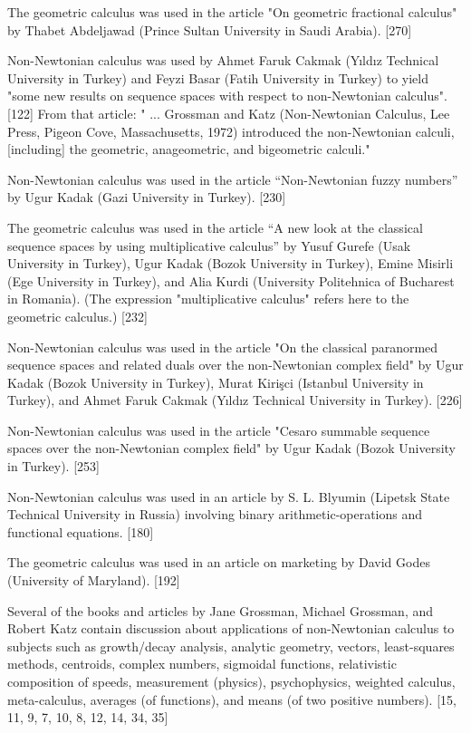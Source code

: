 \documentclass[12pt]{article}
\begin{document}
The geometric calculus was used in the article "On geometric fractional calculus" by Thabet Abdeljawad (Prince Sultan University in Saudi Arabia). [270]
 

Non-Newtonian calculus was used by Ahmet Faruk Cakmak (Yıldız Technical University in Turkey) and Feyzi Basar (Fatih University in Turkey) to yield "some new results on sequence spaces with respect to non-Newtonian calculus". [122] From that article: " ... Grossman and Katz (Non-Newtonian Calculus, Lee Press, Pigeon Cove, Massachusetts, 1972) introduced the non-Newtonian calculi, [including] the geometric, anageometric, and bigeometric calculi."

Non-Newtonian calculus was used in the article “Non-Newtonian fuzzy numbers” by Ugur Kadak (Gazi University in Turkey). [230]

The geometric calculus was used in the article “A new look at the classical sequence spaces by using multiplicative calculus” by Yusuf Gurefe (Usak University in Turkey), Ugur Kadak (Bozok University in Turkey), Emine Misirli (Ege University in Turkey), and Alia Kurdi (University Politehnica of Bucharest in Romania). (The expression "multiplicative calculus" refers here to the geometric calculus.) [232]

Non-Newtonian calculus was used in the article "On the classical paranormed sequence spaces and related duals over the non-Newtonian complex field" by Ugur Kadak (Bozok University in Turkey), Murat Kirişci (Istanbul University in Turkey), and Ahmet Faruk Cakmak (Yıldız Technical University in Turkey). [226]

Non-Newtonian calculus was used in the article "Cesaro summable sequence spaces over the non-Newtonian complex field" by Ugur Kadak (Bozok University in Turkey). [253]

Non-Newtonian calculus was used in an article by S. L. Blyumin (Lipetsk State Technical University in Russia) involving binary arithmetic-operations and functional equations. [180]

The geometric calculus was used in an article on marketing by David Godes (University of Maryland). [192]

Several of the books and articles by Jane Grossman, Michael Grossman, and Robert Katz contain discussion about applications of non-Newtonian calculus to subjects such as growth/decay analysis, analytic geometry, vectors, least-squares methods, centroids, complex numbers, sigmoidal functions, relativistic composition of speeds, measurement (physics), psychophysics, weighted calculus, meta-calculus, averages (of functions), and means (of two positive numbers). [15, 11, 9, 7, 10, 8, 12, 14, 34, 35]
\end{document}
